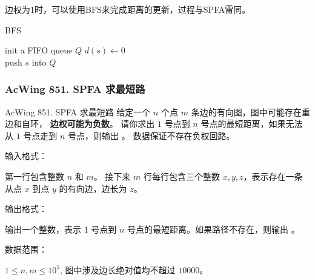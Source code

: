 边权为1时，可以使用BFS来完成距离的更新，过程与SPFA雷同。

\begin{algorithm}[H] %
    \caption{BFS}
    \SetAlgoLined
    init a FIFO queue $Q$\;
    $d(s) \leftarrow 0$\\
    push $s$ into $Q$\\
\end{algorithm}


\subsubsection{AcWing 851. SPFA 求最短路}

\begin{titledbox}{AcWing 851. SPFA 求最短路}
    给定一个 $n$ 个点 $m$ 条边的有向图，图中可能存在重边和自环， \textbf{边权可能为负数}。 请你求出 $1$ 号点到 $n$ 号点的最短距离，如果无法从 $1$ 号点走到 $n$ 号点，则输出 。
    数据保证不存在负权回路。

    输入格式：

    第一行包含整数 $n$ 和 $m$。 接下来 $m$ 行每行包含三个整数 $x,y,z$，表示存在一条从点 $x$ 到点 $y$ 的有向边，边长为 $z$。

    输出格式：

    输出一个整数，表示 $1$ 号点到 $n$ 号点的最短距离。如果路径不存在，则输出 。

    数据范围：

    $1 \le n,m \le 10^5$, 图中涉及边长绝对值均不超过 $10000$。

    \begin{inputblock}
         \\
         \\
         \\
    \end{inputblock}
    \begin{outputblock}
    \end{outputblock}
\end{titledbox}

